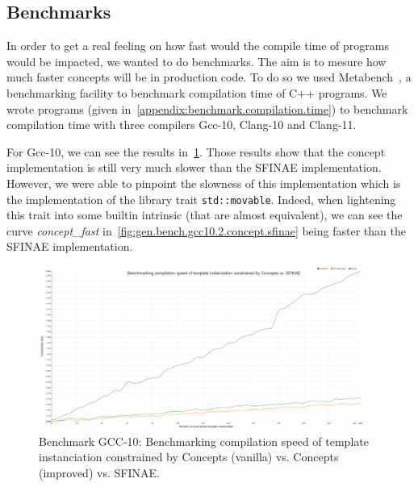 \subsection{Benchmarks}
\label{subsec:benchmarks}


In order to get a real feeling on how fast would the compile time of programs would be impacted, we wanted to do
benchmarks. The aim is to mesure how much faster concepts will be in production code. To do so we used
Metabench~\parencite{dionne.2021.metabench}, a benchmarking facility to benchmark compilation time of C++ programs. We
wrote programs (given in~\cref{appendix:benchmark.compilation.time}) to benchmark compilation time with three compilers
Gcc-10, Clang-10 and Clang-11.

For Gcc-10, we can see the results in~\cref{fig:gen.bench.gcc10.1.concept.sfinae}. Those results show that the concept
implementation is still very much slower than the SFINAE implementation. However, we were able to pinpoint the slowness
of this implementation which is the implementation of the library trait \texttt{std::movable}. Indeed, when lightening
this trait into some builtin intrinsic (that are almost equivalent), we can see the curve \emph{concept\_fast}
in~\cref{fig:gen.bench.gcc10.2.concept.sfinae} being faster than the SFINAE implementation.

\begin{figure}[htb]
  \centering
  \includegraphics[width=4.2in]{figs/compile_time_benches/gcc10/chart.concept.png}
  \caption{Benchmark GCC-10: Benchmarking compilation speed of template instanciation constrained by Concepts (vanilla) vs. Concepts (improved) vs. SFINAE.}
  \label{fig:gen.bench.gcc10.1.concept.sfinae}
\end{figure}

